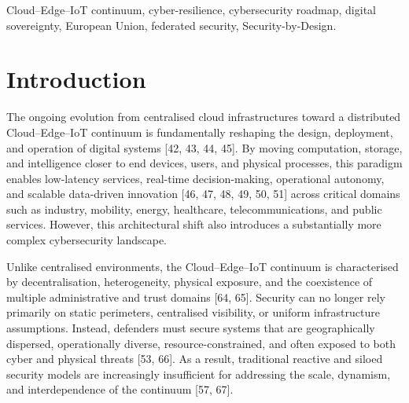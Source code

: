 \documentclass{ieeeaccess}
\newenvironment{keywords}{\begin{IEEEkeywords}}{\end{IEEEkeywords}}
\begin{document}
\begin{keywords}
Cloud--Edge--IoT continuum, cyber-resilience, cybersecurity roadmap, digital sovereignty, European Union, federated security, Security-by-Design.
\end{keywords}

\titlepgskip=-15pt
\maketitle

\section{Introduction}\label{introduction}

The ongoing evolution from centralised cloud infrastructures toward a
distributed Cloud--Edge--IoT continuum is fundamentally reshaping the
design, deployment, and operation of digital systems {[}42, 43, 44,
45{]}. By moving computation, storage, and intelligence closer to end
devices, users, and physical processes, this paradigm enables
low-latency services, real-time decision-making, operational autonomy,
and scalable data-driven innovation {[}46, 47, 48, 49, 50, 51{]} across
critical domains such as industry, mobility, energy, healthcare,
telecommunications, and public services. However, this architectural
shift also introduces a substantially more complex cybersecurity
landscape.

Unlike centralised environments, the Cloud--Edge--IoT continuum is
characterised by decentralisation, heterogeneity, physical exposure, and
the coexistence of multiple administrative and trust domains {[}64,
65{]}. Security can no longer rely primarily on static perimeters,
centralised visibility, or uniform infrastructure assumptions. Instead,
defenders must secure systems that are geographically dispersed,
operationally diverse, resource-constrained, and often exposed to both
cyber and physical threats {[}53, 66{]}. As a result, traditional
reactive and siloed security models are increasingly insufficient for
addressing the scale, dynamism, and interdependence of the continuum
{[}57, 67{]}.
\end{document}
